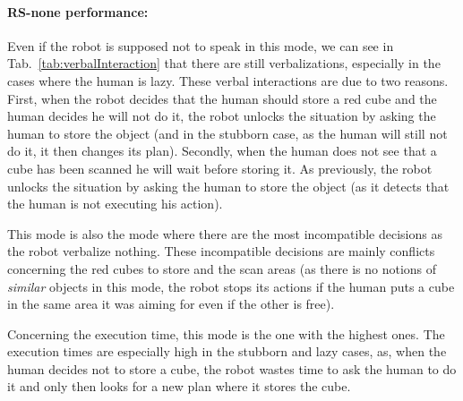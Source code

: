 \documentclass[english,a4paper,11pt,twoside]{StyleThese}
\begin{document}
\paragraph{RS-none performance:} Even if the robot is supposed not to speak in this mode, we can see in Tab.~\ref{tab:verbalInteraction} that there are still verbalizations, especially in the cases where the human is lazy. These verbal interactions are due to two reasons. First, when the robot decides that the human should store a red cube and the human decides he will not do it, the robot unlocks the situation by asking the human to store the object (and in the stubborn case, as the human will still not do it, it then changes its plan). Secondly, when the human does not see that a cube has been scanned he will wait before storing it. As previously, the robot unlocks the situation by asking the human to store the object (as it detects that the human is not executing his action). 

This mode is also the mode where there are the most incompatible decisions as the robot verbalize nothing. These incompatible decisions are mainly conflicts concerning the red cubes to store and the scan areas (as there is no notions of \textit{similar} objects in this mode, the robot stops its actions if the human puts a cube in the same area it was aiming for even if the other is free).

Concerning the execution time, this mode is the one with the highest ones. The execution times are especially high in the stubborn and lazy cases, as, when the human decides not to store a cube, the robot wastes time to ask the human to do it and only then looks for a new plan where it stores the cube. 
\end{document}

